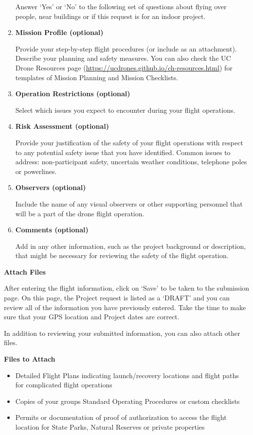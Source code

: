 \documentclass[
  12pt,
]{book}
\providecommand{\tightlist}{%
  \setlength{\itemsep}{0pt}\setlength{\parskip}{0pt}}
\begin{document}
\begin{enumerate}
  Answer `Yes' or `No' to the following set of questions about flying over people, near buildings or if this request is for an indoor project.
\item
  \textbf{Mission Profile (optional)}

  Provide your step-by-step flight procedures (or include as an attachment). Describe your planning and safety measures. You can also check the UC Drone Resources page (\url{https://ucdrones.github.io/ch-resources.html}) for templates of Mission Planning and Mission Checklists.
\item
  \textbf{Operation Restrictions (optional)}

  Select which issues you expect to encounter during your flight operations.
\item
  \textbf{Risk Assessment (optional)}

  Provide your justification of the safety of your flight operations with respect to any potential safety issue that you have identified. Common issues to address: non-participant safety, uncertain weather conditions, telephone poles or powerlines.
\item
  \textbf{Observers (optional)}

  Include the name of any visual observers or other supporting personnel that will be a part of the drone flight operation.
\item
  \textbf{Comments (optional)}

  Add in any other information, such as the project background or description, that might be necessary for reviewing the safety of the flight operation.
\end{enumerate}

\textbf{Attach Files}

After entering the flight information, click on `Save' to be taken to the submission page. On this page, the Project request is listed as a `DRAFT' and you can review all of the information you have previously entered. Take the time to make sure that your GPS location and Project dates are correct.

In addition to reviewing your submitted information, you can also attach other files.

\textbf{Files to Attach}

\begin{itemize}
\tightlist
\item
  Detailed Flight Plans indicating launch/recovery locations and flight paths for complicated flight operations
\item
  Copies of your groups Standard Operating Procedures or custom checklists
\item
  Permits or documentation of proof of authorization to access the flight location for State Parks, Natural Reserves or private properties
\end{itemize}
\end{document}
